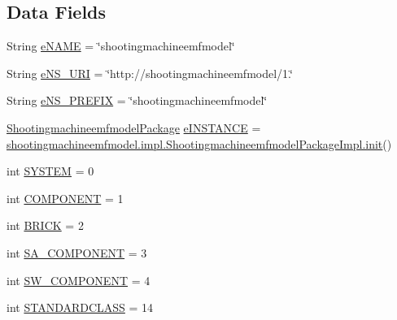 \subsection*{Data Fields}
\begin{DoxyCompactItemize}
\item 
String \hyperlink{interfaceshootingmachineemfmodel_1_1_shootingmachineemfmodel_package_a4478551bf090436803a93ef9544f0f6a}{e\-N\-A\-M\-E} = \char`\"{}shootingmachineemfmodel\char`\"{}
\item 
String \hyperlink{interfaceshootingmachineemfmodel_1_1_shootingmachineemfmodel_package_a82d88995e1a38d22711a9c8a17b873b8}{e\-N\-S\-\_\-\-U\-R\-I} = \char`\"{}http\-://shootingmachineemfmodel/1.\char`\"{}
\item 
String \hyperlink{interfaceshootingmachineemfmodel_1_1_shootingmachineemfmodel_package_a60c635ac3f47cc3d4b2ea76e4a09c980}{e\-N\-S\-\_\-\-P\-R\-E\-F\-I\-X} = \char`\"{}shootingmachineemfmodel\char`\"{}
\item 
\hyperlink{interfaceshootingmachineemfmodel_1_1_shootingmachineemfmodel_package}{Shootingmachineemfmodel\-Package} \hyperlink{interfaceshootingmachineemfmodel_1_1_shootingmachineemfmodel_package_a1a262932821c602a7ee1e9cbb214c625}{e\-I\-N\-S\-T\-A\-N\-C\-E} = \hyperlink{classshootingmachineemfmodel_1_1impl_1_1_shootingmachineemfmodel_package_impl_a5f3f76061791e8fd7740850ffc82b151}{shootingmachineemfmodel.\-impl.\-Shootingmachineemfmodel\-Package\-Impl.\-init}()
\item 
int \hyperlink{interfaceshootingmachineemfmodel_1_1_shootingmachineemfmodel_package_aa429c7f8701b95480346d5662f8d5798}{S\-Y\-S\-T\-E\-M} = 0
\item 
int \hyperlink{interfaceshootingmachineemfmodel_1_1_shootingmachineemfmodel_package_aa320a83958a1e101bf5743c8ea4d98c5}{C\-O\-M\-P\-O\-N\-E\-N\-T} = 1
\item 
int \hyperlink{interfaceshootingmachineemfmodel_1_1_shootingmachineemfmodel_package_a6355a6c7462f68952499f472884795ab}{B\-R\-I\-C\-K} = 2
\item 
int \hyperlink{interfaceshootingmachineemfmodel_1_1_shootingmachineemfmodel_package_a9fd6d4bea46299ebbede2da5a88ff984}{S\-A\-\_\-\-C\-O\-M\-P\-O\-N\-E\-N\-T} = 3
\item 
int \hyperlink{interfaceshootingmachineemfmodel_1_1_shootingmachineemfmodel_package_ab7ed8841e91d706d808f950aa3a7d367}{S\-W\-\_\-\-C\-O\-M\-P\-O\-N\-E\-N\-T} = 4
\item 
int \hyperlink{interfaceshootingmachineemfmodel_1_1_shootingmachineemfmodel_package_ae1c5b272bef559844d19b2f28cadf5dc}{S\-T\-A\-N\-D\-A\-R\-D\-C\-L\-A\-S\-S} = 14

\end{DoxyCompactItemize}
